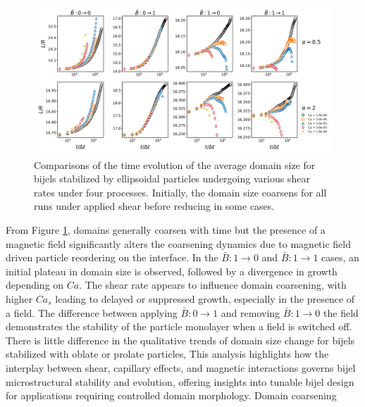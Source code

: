 \begin{figure} 
    \centering 
    \includegraphics[scale=0.3]{../figures/results/paper3/domain_size-time_compare.png} 
    \caption{Comparisons of the time evolution of the average domain size for bijels stabilized by ellipsoidal particles undergoing
             various shear rates under four processes. Initially, the domain size coarsens for all runs under applied shear before
             reducing in some cases.} 
    \label{fig:domain_size_time_shear} 
\end{figure}

From Figure \ref{fig:domain_size_time_shear}, domains generally coarsen with time but the presence of a magnetic field 
significantly alters the coarsening dynamics due to magnetic field driven particle reordering on the interface. In the 
$\bar{B}: 1 \to 0$ and $\bar{B}: 1 \to 1$ cases, an initial plateau in domain size is observed, followed by a divergence in 
growth depending on $Ca$. The shear rate appears to influence domain coarsening, with higher $Ca_s$ leading to delayed or 
suppressed growth, especially in the presence of a field. The difference between applying $\bar{B}: 0 \to 1$ and 
removing $\bar{B}: 1 \to 0$ the field demonstrates the stability of the particle monolayer when a field is switched off.
There is little difference in the qualitative trends of domain size change for bijels stabilized with oblate or prolate particles,
This analysis highlights how the interplay between shear, capillary effects, and magnetic interactions governs bijel 
microstructural stability and evolution, offering insights into tunable bijel design for applications requiring controlled 
domain morphology. Domain coarsening   

